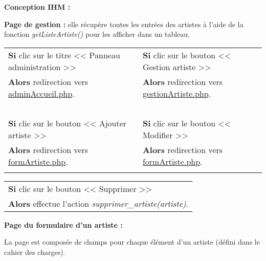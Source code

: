 			\begin{paragraphe}
				\textbf{Conception IHM :}
			\end{paragraphe}
            
            \begin{paragraphe}
                \textbf{Page de gestion :} elle récupère toutes les entrées des artistes à l'aide de la fonction \emph{getListeArtiste()} pour les afficher dans un tableau.
            \end{paragraphe}

            \begin{center}
                \begin{tabular}{l | l}
                    \textbf{Si} clic sur le titre << Panneau administration >> & \textbf{Si} clic sur le bouton << Gestion artiste >> \\
                    \textbf{Alors} redirection vers \underline{adminAccueil.php}. & \textbf{Alors} redirection vers \underline{gestionArtiste.php}. \\ \\

                    \textbf{Si} clic sur le bouton << Ajouter artiste >> & \textbf{Si} clic sur le bouton << Modifier >> \\
                    \textbf{Alors} redirection vers \underline{formArtiste.php}. & \textbf{Alors} redirection vers \underline{formArtiste.php}. \\ \\
                \end{tabular}

                \begin{tabular}{l}
                    \textbf{Si} clic sur le bouton << Supprimer >> \\
                    \textbf{Alors} effectue l'action \emph{supprimer\_artiste(artiste)}.
                \end{tabular}
            \end{center}
            
            
            \begin{paragraphe}
                \textbf{Page du formulaire d'un artiste :}
            \end{paragraphe}
            
            \begin{paragraphe}
                La page est composée de champs pour chaque élément d'un artiste (défini dans le cahier des charges).
            \end{paragraphe}

